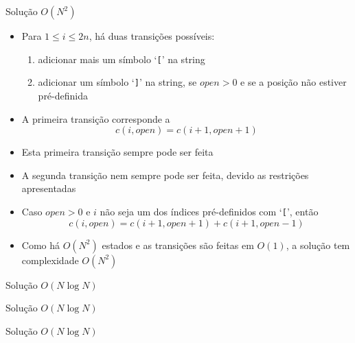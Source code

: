 \begin{frame}[fragile]{Solução $O(N^2)$}

    \begin{itemize}
        \item Para $1\leq i\leq 2n$, há duas transições possíveis:
        \begin{enumerate}
            \item adicionar mais um símbolo `\texttt{[}' na string
            \item adicionar um símbolo `\texttt{]}' na string, se $open > 0$ e se a posição não
                estiver pré-definida
        \end{enumerate}

        \item A primeira transição corresponde a
        \[
            c(i, open) = c(i + 1, open + 1)
        \]

        \item Esta primeira transição sempre pode ser feita

        \item A segunda transição nem sempre pode ser feita, devido as restrições apresentadas

        \item Caso $open > 0$ e $i$ não seja um dos índices pré-definidos com `\texttt{[}', então
        \[
            c(i, open) = c(i + 1, open + 1) + c(i + 1, open - 1)
        \]

        \item Como há $O(N^2)$ estados e as transições são feitas em $O(1)$, a solução tem
            complexidade $O(N^2)$
    \end{itemize}

\end{frame}

\begin{frame}[fragile]{Solução $O(N\log N)$}
\end{frame}

\begin{frame}[fragile]{Solução $O(N\log N)$}
\end{frame}

\begin{frame}[fragile]{Solução $O(N\log N)$}
\end{frame}
